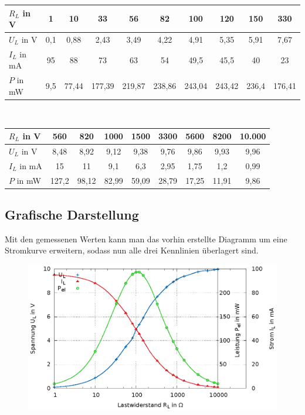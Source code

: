 \documentclass[
a4paper,     %
 headsepline, %
11pt         %
]{scrartcl}  %
\begin{document}
\begin{flushleft}
\begin{tabular}{ l | c | c | c | c | c | c | c | c | c  }
    \hline
    $R_L$ in V   & 1    & 10    & 33     & 56     & 82     & 100    & 120    & 150   & 330         \\ \hline
    $U_L$ in V   & 0,1  & 0,88  & 2,43   & 3,49   & 4,22   & 4,91   & 5,35   & 5,91  & 7,67      \\ \hline
    $I_L$ in mA  & 95   & 88    & 73     & 63     & 54     & 49,5   & 45,5   & 40    & 23      \\ \hline
    $P$ in mW    & 9,5  & 77,44 & 177,39 & 219,87 & 238,86 & 243,04 & 243,42 & 236,4 & 176,41      \\ 
    \hline
\end{tabular} \\
\begin{tabular}{ l | c | c | c | c | c | c | c | c }
    \hline
    $R_L$ in V  & 560    & 820   & 1000   & 1500  & 3300  & 5600   & 8200   & 10.000   \\ \hline
    $U_L$ in V  & 8,48   & 8,92  & 9,12   & 9,38  & 9,76  & 9,86   & 9,93   & 9,96    \\ \hline
    $I_L$ in mA & 15     & 11    & 9,1    & 6,3   & 2,95  & 1,75   & 1,2    & 0,99    \\ \hline
    $P$ in mW   & 127,2  & 98,12 & 82,99  & 59,09 & 28,79 & 17,25  & 11,91  & 9,86    \\
    \hline
\end{tabular}
\end{flushleft}
\subsection{Grafische Darstellung}
Mit den gemessenen Werten kann man das vorhin erstellte Diagramm um eine Stromkurve erweitern, sodass nun alle drei Kennlinien überlagert sind.

\begin{figure}[hbtp]
\centering
\includegraphics[scale=1]{diagramme.eps}
\end{figure}
\end{document}
